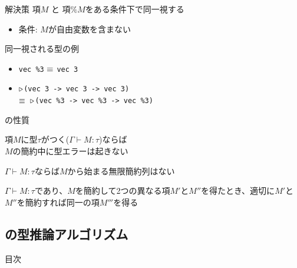 \documentclass[dvipdfmx,aspectratio=169, 20pt]{beamer}
\begin{document}
\begin{frame}[fragile]{解決策}
    項\( M \) と 項\( \%M \)をある条件下で同一視する
    \begin{itemize}
        \item 条件: \( M \)が自由変数を含まない
    \end{itemize}
    \begin{exampleblock}{同一視される型の例}
        \begin{itemize}
            \item \verb|vec %3| \( \equiv \) \verb|vec 3|
            \item \({\mathop{\triangleright}}\)\verb|(vec 3 -> vec 3 -> vec 3)| \\
                \( \equiv \)\ \({\mathop{\triangleright}}\)\verb|(vec %3 -> vec %3 -> vec %3)|
        \end{itemize}
    \end{exampleblock}
\end{frame}

\begin{frame}[fragile]{\LMD の性質}
    \begin{theorem}[型安全性]
        項\(M\)に型\(\tau\)がつく(\(\Gamma \vdash M : \tau \))ならば\\
        \(M\)の簡約中に型エラーは起きない
    \end{theorem}
    \begin{theorem}[強正規化性]
        \(\Gamma \vdash M : \tau \)ならば\(M\)から始まる無限簡約列はない
    \end{theorem}
    \begin{theorem}[合流性]
        \(\Gamma \vdash M : \tau \)であり、\(M\)を簡約して2つの異なる項\(M'\)と\(M''\)を得たとき、適切に\(M'\)と\(M''\)を簡約すれば同一の項\(M'''\)を得る
    \end{theorem}
\end{frame}

\subsection{\LMD の型推論アルゴリズム}

\begin{frame}{目次}
\end{frame}
\end{document}
